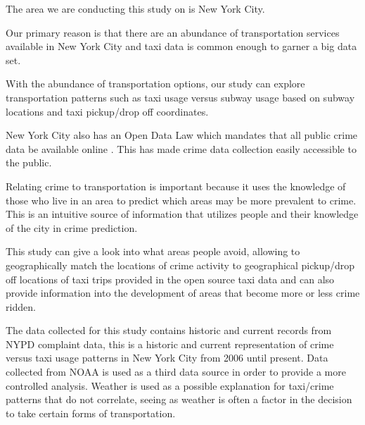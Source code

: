 \documentclass{sigkddExp}
\begin{document}
The area we are conducting this study on is New York City.


Our primary reason is that there are an abundance of transportation services available in New York City and taxi data is common enough to garner a big data set. 


With the abundance of transportation options, our study can explore transportation patterns such as taxi usage versus subway usage based on subway locations and taxi pickup/drop off coordinates. %

New York City also has an Open Data Law which mandates that all public crime data be available online \cite{OpenDat}. This has made crime data collection easily accessible to the public.

Relating crime to transportation is important because it uses the knowledge of those who live in an area to predict which areas may be more prevalent to crime. %
This is an intuitive source of information that utilizes people and their knowledge of the city in crime prediction. %

This study can give a look into what areas people avoid, allowing to geographically match the locations of crime activity to geographical pickup/drop off locations of taxi trips provided in the open source taxi data \cite{Taxi} and can also provide information into the development of areas that become more or less crime ridden. 

The data collected for this study contains historic \cite{NYPDHis} and current \cite{NYPDCur} records from NYPD complaint data, this is a historic and current representation of crime versus taxi usage patterns in New York City from 2006 until present. Data collected from NOAA \cite{NOAA} is used as a third data source in order to provide a more controlled analysis. Weather is used as a possible explanation for taxi/crime patterns that do not correlate, seeing as weather is often a factor in the decision to take certain forms of transportation.%
\end{document}
